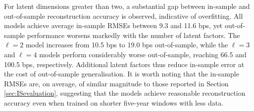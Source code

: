 For latent dimensions greater than two, a substantial gap between in-sample and out-of-sample reconstruction accuracy is observed, indicative of overfitting. All models achieve average in-sample RMSEs between 9.3 and 11.6 bps, yet out-of-sample performance worsens markedly with the number of latent factors. The $\ell=2$ model increases from 10.5 bps to 19.0 bps out-of-sample, while the $\ell=3$ and $\ell=4$ models perform considerably worse out-of-sample, reaching 66.5 and 100.5 bps, respectively. Additional latent factors thus reduce in-sample error at the cost of out-of-sample generalisation. It is worth noting that the in-sample RMSEs are, on average, of similar magnitude to those reported in Section \ref{sec:ISevaluation}, suggesting that the models achieve reasonable reconstruction accuracy even when trained on shorter five-year windows with less data.




